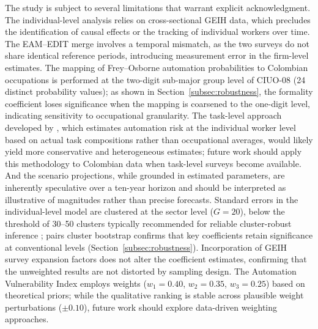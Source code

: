 \documentclass{article}
\begin{document}
The study is subject to several limitations that warrant explicit acknowledgment. The individual-level analysis relies on cross-sectional GEIH data, which precludes the identification of causal effects or the tracking of individual workers over time. The EAM--EDIT merge involves a temporal mismatch, as the two surveys do not share identical reference periods, introducing measurement error in the firm-level estimates. The mapping of Frey--Osborne automation probabilities to Colombian occupations is performed at the two-digit sub-major group level of CIUO-08 (24 distinct probability values); as shown in Section~\ref{subsec:robustness}, the formality coefficient loses significance when the mapping is coarsened to the one-digit level, indicating sensitivity to occupational granularity. The task-level approach developed by \cite{arntz2016}, which estimates automation risk at the individual worker level based on actual task compositions rather than occupational averages, would likely yield more conservative and heterogeneous estimates; future work should apply this methodology to Colombian data when task-level surveys become available. And the scenario projections, while grounded in estimated parameters, are inherently speculative over a ten-year horizon and should be interpreted as illustrative of magnitudes rather than precise forecasts. Standard errors in the individual-level model are clustered at the sector level ($G = 20$), below the threshold of 30--50 clusters typically recommended for reliable cluster-robust inference \cite{autor2013}; pairs cluster bootstrap confirms that key coefficients retain significance at conventional levels (Section~\ref{subsec:robustness}). Incorporation of GEIH survey expansion factors does not alter the coefficient estimates, confirming that the unweighted results are not distorted by sampling design. The Automation Vulnerability Index employs weights ($w_1 = 0.40$, $w_2 = 0.35$, $w_3 = 0.25$) based on theoretical priors; while the qualitative ranking is stable across plausible weight perturbations ($\pm 0.10$), future work should explore data-driven weighting approaches.
\end{document}

